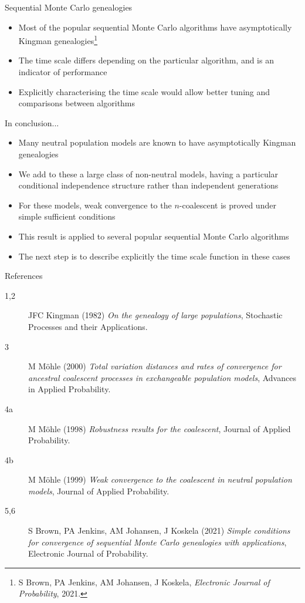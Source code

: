 \documentclass[aspectratio=169,fleqn]{beamer}
\theoremstyle{definition}
\begin{document}
\begin{frame}{Sequential Monte Carlo genealogies}
	\begin{itemize}
	\item Most of the popular sequential Monte Carlo algorithms have asymptotically Kingman genealogies\footnote{S Brown, PA Jenkins, AM Johansen, J Koskela, \textit{Electronic Journal of Probability}, 2021.}
	\item The time scale differs depending on the particular algorithm, and is an indicator of performance 
	\item Explicitly characterising the time scale would allow better tuning and comparisons between algorithms
	\end{itemize}
\end{frame}


\begin{frame}{In conclusion...}
\begin{itemize}
\item Many neutral population models are known to have asymptotically Kingman genealogies
\item We add to these a large class of non-neutral models, having a particular conditional independence structure rather than independent generations
\item For these models, weak convergence to the $n$-coalescent is proved under simple sufficient conditions
\item This result is applied to several popular sequential Monte Carlo algorithms
\item The next step is to describe explicitly the time scale function in these cases
\end{itemize}
\end{frame}


\begin{frame}{References}
\begin{description}
\item [1,2] JFC Kingman (1982) \textit{On the genealogy of large populations}, Stochastic Processes and their Applications.
\item [3] M M\"ohle (2000) \textit{Total variation distances and rates of convergence for ancestral coalescent processes in exchangeable population models}, Advances in Applied Probability.
\item [4a] M M\"ohle (1998) \textit{Robustness results for the coalescent}, Journal of Applied Probability.
\item [4b] M M\"ohle (1999) \textit{Weak convergence to the coalescent in neutral population models}, Journal of Applied Probability.
\item [5,6] S Brown, PA Jenkins, AM Johansen, J Koskela (2021) \textit{Simple conditions for convergence of sequential Monte Carlo genealogies with applications}, Electronic Journal of Probability.
\end{description}
\end{frame}
\end{document}
